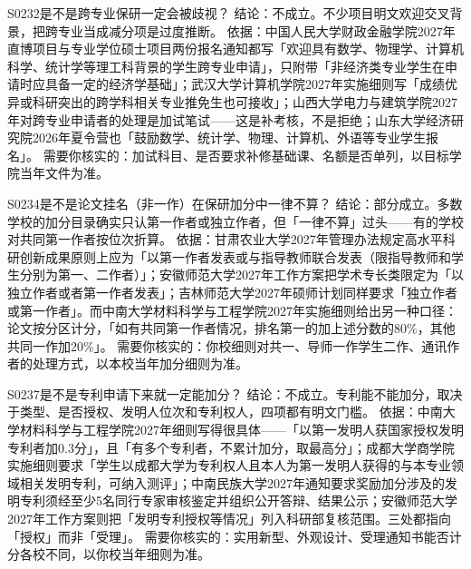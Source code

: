 \begin{qa}{S0232}{是不是跨专业保研一定会被歧视？}
结论：不成立。不少项目明文欢迎交叉背景，把跨专业当成减分项是过度推断。
依据：中国人民大学财政金融学院2027年直博项目与专业学位硕士项目两份报名通知都写「欢迎具有数学、物理学、计算机科学、统计学等理工科背景的学生跨专业申请」，只附带「非经济类专业学生在申请时应具备一定的经济学基础」；武汉大学计算机学院2027年实施细则写「成绩优异或科研突出的跨学科相关专业推免生也可接收」；山西大学电力与建筑学院2027年对跨专业申请者的处理是加试笔试——这是补考核，不是拒绝；山东大学经济研究院2026年夏令营也「鼓励数学、统计学、物理、计算机、外语等专业学生报名」。
需要你核实的：加试科目、是否要求补修基础课、名额是否单列，以目标学院当年文件为准。
\end{qa}

\begin{qa}{S0234}{是不是论文挂名（非一作）在保研加分中一律不算？}
结论：部分成立。多数学校的加分目录确实只认第一作者或独立作者，但「一律不算」过头——有的学校对共同第一作者按位次折算。
依据：甘肃农业大学2027年管理办法规定高水平科研创新成果原则上应为「以第一作者发表或与指导教师联合发表（限指导教师和学生分别为第一、二作者）」；安徽师范大学2027年工作方案把学术专长类限定为「以独立作者或者第一作者发表」；吉林师范大学2027年硕师计划同样要求「独立作者或第一作者」。而中南大学材料科学与工程学院2027年实施细则给出另一种口径：论文按分区计分，「如有共同第一作者情况，排名第一的加上述分数的80\%，其他共同一作加20\%」。
需要你核实的：你校细则对共一、导师一作学生二作、通讯作者的处理方式，以本校当年加分细则为准。
\end{qa}

\begin{qa}{S0237}{是不是专利申请下来就一定能加分？}
结论：不成立。专利能不能加分，取决于类型、是否授权、发明人位次和专利权人，四项都有明文门槛。
依据：中南大学材料科学与工程学院2027年细则写得很具体——「以第一发明人获国家授权发明专利者加0.3分」，且「有多个专利者，不累计加分，取最高分」；成都大学商学院实施细则要求「学生以成都大学为专利权人且本人为第一发明人获得的与本专业领域相关发明专利，可纳入测评」；中南民族大学2027年通知要求奖励加分涉及的发明专利须经至少5名同行专家审核鉴定并组织公开答辩、结果公示；安徽师范大学2027年工作方案则把「发明专利授权等情况」列入科研部复核范围。三处都指向「授权」而非「受理」。
需要你核实的：实用新型、外观设计、受理通知书能否计分各校不同，以你校当年细则为准。
\end{qa}

